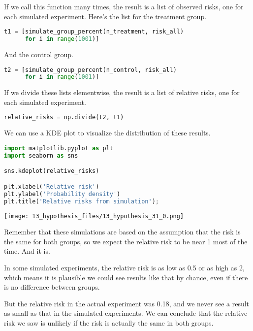 If we call this function many times, the result is a list of observed
risks, one for each simulated experiment. Here's the list for the
treatment group.

\begin{lstlisting}[language=Python,style=source]
t1 = [simulate_group_percent(n_treatment, risk_all)
      for i in range(1001)]
\end{lstlisting}

And the control group.

\begin{lstlisting}[language=Python,style=source]
t2 = [simulate_group_percent(n_control, risk_all)
      for i in range(1001)]
\end{lstlisting}

If we divide these lists elementwise, the result is a list of relative
risks, one for each simulated experiment.

\begin{lstlisting}[language=Python,style=source]
relative_risks = np.divide(t2, t1)
\end{lstlisting}

We can use a KDE plot to visualize the distribution of these results.

\begin{lstlisting}[language=Python,style=source]
import matplotlib.pyplot as plt
import seaborn as sns

sns.kdeplot(relative_risks)

plt.xlabel('Relative risk')
plt.ylabel('Probability density')
plt.title('Relative risks from simulation');
\end{lstlisting}

\begin{center}
\texttt{[image: 13\_hypothesis\_files/13\_hypothesis\_31\_0.png]}
\end{center}

Remember that these simulations are based on the assumption that the
risk is the same for both groups, so we expect the relative risk to be
near 1 most of the time. And it is.

In some simulated experiments, the relative risk is as low as 0.5 or as
high as 2, which means it is plausible we could see results like that by
chance, even if there is no difference between groups.

But the relative risk in the actual experiment was 0.18, and we never
see a result as small as that in the simulated experiments. We can
conclude that the relative risk we saw is unlikely if the risk is
actually the same in both groups.

